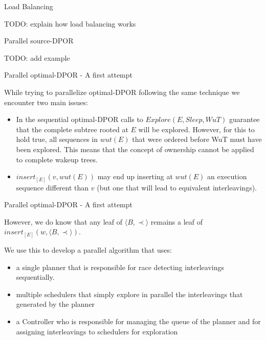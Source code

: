 \documentclass[9pt]{beamer}
\begin{document}
\begin{frame} {Load Balancing}

TODO: explain how load balancing works

\end{frame}

\begin{frame} {Parallel source-DPOR}

TODO: add example

\end{frame}


\begin{frame} {Parallel optimal-DPOR - A first attempt}

While trying to parallelize optimal-DPOR following the same technique we encounter two main issues:

\begin{itemize}
\item In the sequential optimal-DPOR calls to $Explore(E, Sleep, WuT)$ guarantee that the complete subtree rooted
at $E$ will be explored. However, for this to hold true,
all sequences in $wut(E)$ that were ordered before WuT must have been explored. This means that the concept of ownership cannot be applied to complete wakeup trees.
\item $insert_{[E]}(v,wut(E))$ may end up inserting at $wut(E)$ an execution sequence different than $v$ (but one that will lead to equivalent interleavings).
\end{itemize}

\end{frame}

\begin{frame} {Parallel optimal-DPOR - A first attempt}

However, we do know that any leaf of $\langle B , \prec \rangle$ remains a leaf of $insert_{[E]}(w,\langle B , \prec \rangle)$.

We use this to develop a parallel algorithm that uses:

\begin{itemize}
  \item a single planner that is responsible for race detecting interleavings sequentially.
  \item multiple schedulers that simply explore in parallel the interleavings
  that generated by the planner
  \item a Controller who is responsible for managing the queue of the planner and for assigning interleavings to schedulers for exploration
\end{itemize}

\end{frame}
\end{document}
